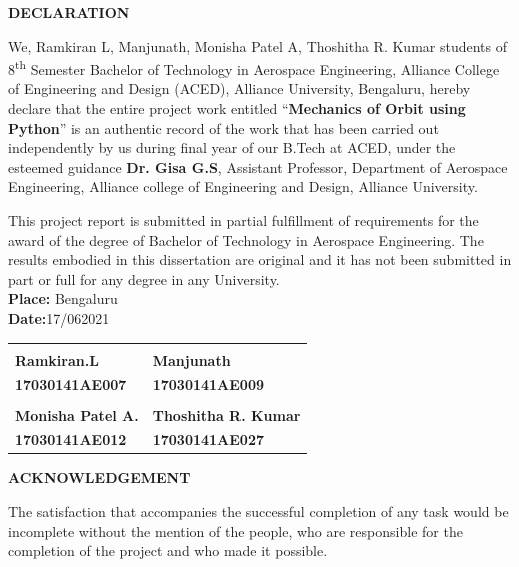 \documentclass[12pt]{article}
\begin{document}
\thispagestyle{empty}
\newpage
\begin{center}
\Large \textbf{DECLARATION}
\end{center}
\normalsize
\hspace{4em}We, Ramkiran L, Manjunath, Monisha Patel A, Thoshitha R. Kumar students of 8\textsuperscript{th} Semester Bachelor of Technology in Aerospace Engineering, Alliance College of Engineering and Design (ACED), Alliance University, Bengaluru, hereby declare that the entire project work entitled \enquote{\textbf{Mechanics of Orbit using Python}} is an authentic record of the work that has been carried out independently by us during final year of our B.Tech at ACED, under the esteemed guidance \textbf{Dr. Gisa G.S}, Assistant Professor, Department of Aerospace Engineering, Alliance college of Engineering and Design, Alliance University. \par

This project report is submitted in partial fulfillment of requirements for the award of the degree of Bachelor of Technology in Aerospace Engineering. The results embodied in this dissertation are original and it has not been submitted in part or full for any degree in any University. \vspace{4em}\\
\textbf{Place:} Bengaluru\\
\textbf{Date:}17/062021 \vspace{5em}\\

\begin{center}
\begin{tabular}{K{7.5cm} K{7.5cm}}
\underline{\hspace{2.5cm}} & \underline{\hspace{2.5cm}} \\ 
\textbf{Ramkiran.L} & \textbf{Manjunath} \\ 
\textbf{17030141AE007} & \textbf{17030141AE009} \vspace{3em}\\ 
\underline{\hspace{3cm}} & \underline{\hspace{4cm}} \\ 
\textbf{Monisha Patel A.} & \textbf{Thoshitha R. Kumar} \\ 
\textbf{17030141AE012} & \textbf{17030141AE027}
\end{tabular} 
\end{center}
\thispagestyle{empty}
\newpage
\begin{center}
\Large \textbf{ACKNOWLEDGEMENT}
\end{center}
\normalsize
\hspace{4em}The satisfaction that accompanies the successful completion of any task would be incomplete without the mention of the people, who are responsible for the completion of the project and who made it possible.\par
\end{document}
